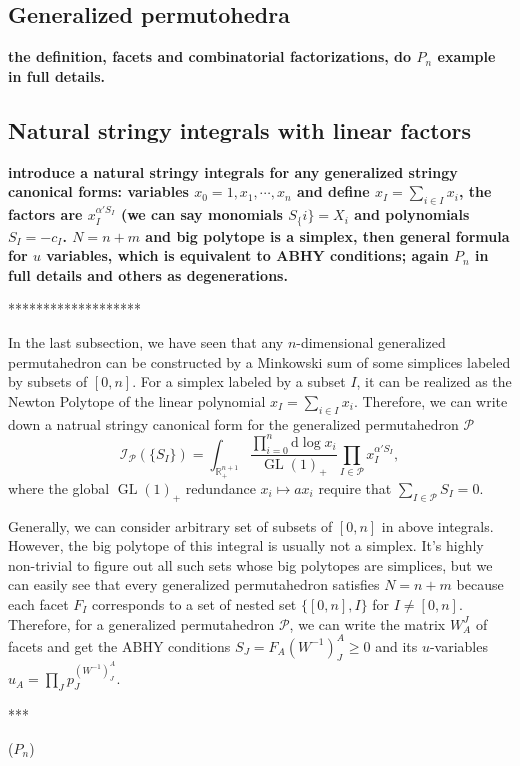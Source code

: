\documentclass[hidelinks,12pt]{article}
\begin{document}
\subsection{Generalized permutohedra} {\bf the definition, facets and combinatorial factorizations, do $P_n$ example in full details.}

\subsection{Natural stringy integrals with linear factors} 

{\bf introduce a natural stringy integrals for any generalized stringy canonical forms: variables $x_0=1, x_1, \cdots, x_n$ and define $x_I=\sum_{i \in I} x_i$, the factors are $x_I^{\alpha' S_I}$ (we can say monomials $S_\{i\}=X_i$ and polynomials $S_I=-c_I$. $N=n+m$ and big polytope is a simplex, then general formula for $u$ variables, which is equivalent to ABHY conditions; again $P_n$ in full details and others as degenerations.}

*******************

In the last subsection, we have seen that any $n$-dimensional generalized 
permutahedron can be constructed by a Minkowski sum of some simplices labeled by
subsets of $[0,n]$. For a simplex labeled by a subset $I$, it can be realized as the 
Newton Polytope of the linear polynomial $x_I=\sum_{i\in I}x_i$. Therefore, we can
write down a natrual stringy canonical form for the generalized permutahedron 
$\mathscr P$
\[
	\mathcal I_{\mathscr P}(\{S_I\})=\int_{\mathbb R^{n+1}_+}
	\frac{\prod_{i=0}^n \mathrm{d}\log x_i}
	{\operatorname{GL}(1)_+}\prod_{I\in\mathscr P}x_I^{\alpha' S_I},
\]
where the global $\operatorname{GL}(1)_+$ redundance $x_i\mapsto a x_i$ require that 
$\sum_{I\in\mathscr P}S_I = 0$. 

Generally, we can consider arbitrary set of subsets of $[0,n]$ in above integrals. 
However, the big polytope of this integral is usually not a simplex.
It's highly non-trivial to figure out all such sets whose big polytopes are simplices,
but we can easily see that every generalized permutahedron satisfies $N=n+m$
because each facet $F_I$ corresponds to a set of nested set $\{[0,n],I\}$ for 
$I\neq [0,n]$.
Therefore, for a generalized permutahedron $\mathscr P$, we can write the matrix 
$W^J_A$ of facets and get the ABHY conditions $S_J=F_A(W^{-1})^A_J\geq 0$ and 
its $u$-variables $u_A=\prod_J p_J^{(W^{-1})^A_J}$.

***

($P_n$)
\end{document}
